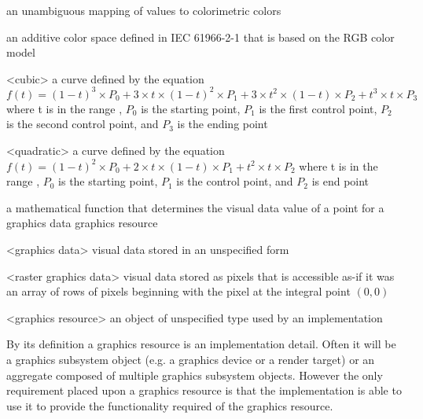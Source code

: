 an unambiguous mapping of values to colorimetric colors

an additive color space defined in IEC 61966-2-1 that is based on the RGB color model

<cubic> a curve defined by the 
equation $f(t) = (1 - t)^{3} \times P_{0} + 3 \times t \times (1 - t)^{2} 
\times P_{1} + 3 \times t^{2} \times (1 - t) \times P_{2} + t^{3} \times t 
\times P_{3}$ where t is in the range , $P_{0}$ is the starting point, $P_{1}$ 
is the first control point, $P_{2}$ is the second control point, and $P_{3}$ is 
the ending point

<quadratic> a curve defined by the 
equation $f(t) = (1 - t)^{2} \times P_{0} + 2 \times t \times (1 - t) 
\times P_{1} + t^{2} \times t \times P_{2}$ where t is in the range , $P_{0}$ is the starting point, $P_{1}$ is the 
control point, and $P_{2}$ is end point

a mathematical function that determines the visual data value of a point for a graphics data graphics resource

<graphics data> visual data stored in an unspecified form

<raster graphics data> visual data stored as pixels that is accessible as-if it was an array of rows of pixels beginning with the pixel at the integral point $(0,0)$

<graphics resource> an object of unspecified type used by an implementation
\begin{note}
By its definition a graphics resource is an implementation detail. Often it will be a graphics subsystem object (e.g. a graphics device or a render target) or an aggregate composed of multiple graphics subsystem objects. However the only requirement placed upon a graphics resource is that the implementation is able to use it to provide the functionality required of the graphics resource.
\end{note}

